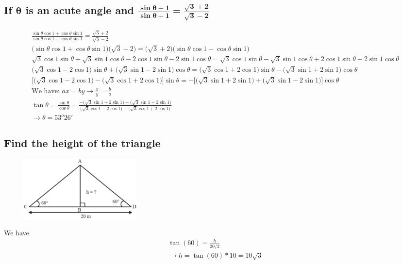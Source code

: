\documentclass{article}
\begin{document}
\subsection{If $\mathbf{\theta}$ is an acute angle and $\mathbf{\frac{\sin\theta + 1}{\sin\theta + 1} = \frac{\sqrt{3}+2}{\sqrt{3}-2}}$}
\begin{align*}
    &\frac{\sin\theta \cos1 + \cos\theta \sin1}{\sin\theta \cos1 - \cos\theta \sin1} = \frac{\sqrt{3}+2}{\sqrt{3}-2} \\
    &\Big(\sin\theta \cos1 + \cos\theta \sin1\Big)\Big(\sqrt{3}-2\Big)=\Big(\sqrt{3}+2\Big)\Big(\sin\theta \cos1 - \cos\theta \sin1\Big) \\
    &\sqrt{3}\cos1\sin\theta + \sqrt{3}\sin1\cos\theta - 2\cos1\sin\theta - 2\sin1\cos\theta = \sqrt{3}\cos1\sin\theta - \sqrt{3}\sin1\cos\theta + 2\cos1\sin\theta - 2\sin1\cos\theta \\
    &\Big(\sqrt{3}\cos1 - 2\cos1\Big)\sin\theta + \Big(\sqrt{3}\sin1-2\sin1)\cos\theta = \Big(\sqrt{3}\cos1 + 2\cos1\Big)\sin\theta - \Big(\sqrt{3}\sin1 + 2\sin1\Big)\cos\theta \\
    & \Bigg[\Big(\sqrt{3}\cos1 - 2\cos1\Big)-\Big(\sqrt{3}\cos1+2\cos1\Big) \Bigg] \sin\theta = -\Bigg[\Big(\sqrt{3}\sin1 + 2\sin1 \Big) + \Big(\sqrt{3}\sin1 - 2\sin1\Big)\Bigg] \cos\theta \\
    & \text{We have:  } ax=by \rightarrow \frac{x}{y} = \frac{b}{a} \\
    &  \tan\theta = \frac{\sin\theta}{\cos\theta} = \frac{-\Big(\sqrt{3}\sin1 + 2\sin1\Big) - (\sqrt{3}\sin1 - 2\sin1 \Big)}{\Big(\sqrt{3}\cos1-2\cos1\Big) - \Big(\sqrt{3}\cos1 + 2\cos1\Big)} \\
    & \rightarrow \theta = 53^o26'
\end{align*}

\begin{multicols}{2}

\subsection{Find the height of the triangle}
\begin{figure}[H]
    \centering
    \includegraphics[width=0.3\textwidth]{expert-Tr4.png}
\end{figure}
We have
\begin{align*}
    &\tan(60) = \frac{h}{20/2} \\
    &\rightarrow h = \tan(60)*10 = 10\sqrt{3}
\end{align*}

\end{multicols}
\end{document}
